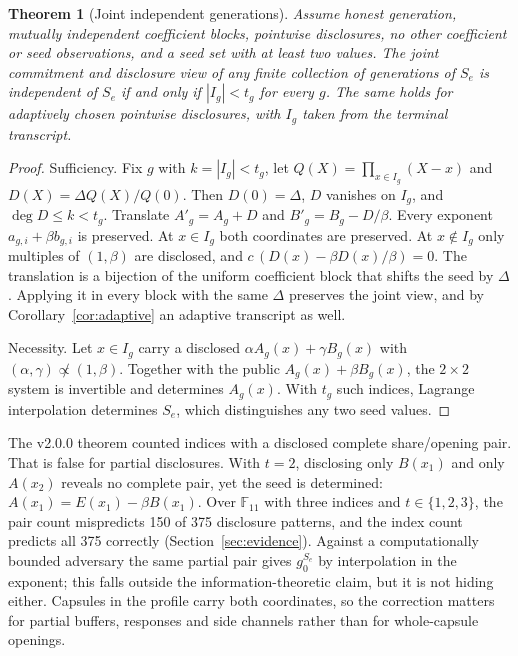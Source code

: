 \documentclass[pdflatex,sn-mathphys-num]{sn-jnl}
\theoremstyle{plain}
\newtheorem{theorem}{Theorem}
\theoremstyle{definition}
\newcommand{\F}{\mathbb{F}}
\begin{document}
\begin{theorem}[Joint independent generations]\label{thm:generations}
Assume honest generation, mutually independent coefficient blocks, pointwise disclosures, no other coefficient or seed observations, and a seed set with at least two values. The joint commitment and disclosure view of any finite collection of generations of $S_e$ is independent of $S_e$ if and only if $|I_g|<t_g$ for every $g$. The same holds for adaptively chosen pointwise disclosures, with $I_g$ taken from the terminal transcript.
\end{theorem}
\begin{proof}
Sufficiency. Fix $g$ with $k=|I_g|<t_g$, let $Q(X)=\prod_{x\in I_g}(X-x)$ and $D(X)=\Delta Q(X)/Q(0)$. Then $D(0)=\Delta$, $D$ vanishes on $I_g$, and $\deg D\le k<t_g$. Translate $A'_g=A_g+D$ and $B'_g=B_g-D/\beta$. Every exponent $a_{g,i}+\beta b_{g,i}$ is preserved. At $x\in I_g$ both coordinates are preserved. At $x\notin I_g$ only multiples of $(1,\beta)$ are disclosed, and $c\,(D(x)-\beta D(x)/\beta)=0$. The translation is a bijection of the uniform coefficient block that shifts the seed by $\Delta$. Applying it in every block with the same $\Delta$ preserves the joint view, and by Corollary~\ref{cor:adaptive} an adaptive transcript as well.

Necessity. Let $x\in I_g$ carry a disclosed $\alpha A_g(x)+\gamma B_g(x)$ with $(\alpha,\gamma)\not\propto(1,\beta)$. Together with the public $A_g(x)+\beta B_g(x)$, the $2\times2$ system is invertible and determines $A_g(x)$. With $t_g$ such indices, Lagrange interpolation determines $S_e$, which distinguishes any two seed values.
\end{proof}

The v2.0.0 theorem counted indices with a disclosed complete share/opening pair. That is false for partial disclosures. With $t=2$, disclosing only $B(x_1)$ and only $A(x_2)$ reveals no complete pair, yet the seed is determined: $A(x_1)=E(x_1)-\beta B(x_1)$. Over $\F_{11}$ with three indices and $t\in\{1,2,3\}$, the pair count mispredicts 150 of 375 disclosure patterns, and the index count predicts all 375 correctly (Section~\ref{sec:evidence}). Against a computationally bounded adversary the same partial pair gives $g_0^{S_e}$ by interpolation in the exponent; this falls outside the information-theoretic claim, but it is not hiding either. Capsules in the profile carry both coordinates, so the correction matters for partial buffers, responses and side channels rather than for whole-capsule openings.
\end{document}
